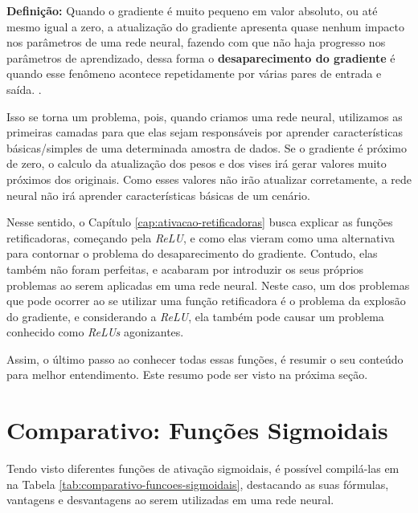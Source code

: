 \begin{definicaomoderna}{\textbf{Definição:}}
Quando o gradiente é muito pequeno em valor absoluto, ou até mesmo igual a zero, a atualização do gradiente apresenta quase nenhum impacto nos parâmetros de uma rede neural, fazendo com que não haja progresso nos parâmetros de aprendizado, dessa forma o \textbf{desaparecimento do gradiente} é quando esse fenômeno acontece repetidamente por várias pares de entrada e saída. \parencite{ActivationFunctionsLederer}.
\end{definicaomoderna}

Isso se torna um problema, pois, quando criamos uma rede neural, utilizamos as primeiras camadas para que elas sejam responsáveis por aprender características básicas/simples de uma determinada amostra de dados. Se o gradiente é próximo de zero, o calculo da atualização dos pesos e dos vises irá gerar valores muito próximos dos originais. Como esses valores não irão atualizar corretamente, a rede neural não irá aprender características básicas de um cenário.

Nesse sentido, o Capítulo \ref{cap:ativacao-retificadoras} busca explicar as funções retificadoras, começando pela \textit{ReLU}, e como elas vieram como uma alternativa para contornar o problema do desaparecimento do gradiente. Contudo, elas também não foram perfeitas, e acabaram por introduzir os seus próprios problemas ao serem aplicadas em uma rede neural. Neste caso, um dos problemas que pode ocorrer ao se utilizar uma função retificadora é o problema da explosão do gradiente, e considerando a \textit{ReLU}, ela também pode causar um problema conhecido como \textit{ReLUs} agonizantes.

Assim, o último passo ao conhecer todas essas funções, é resumir o seu conteúdo para melhor entendimento. Este resumo pode ser visto na próxima seção.

\section{Comparativo: Funções Sigmoidais}

Tendo visto diferentes funções de ativação sigmoidais, é possível compilá-las em na Tabela \ref{tab:comparativo-funcoes-sigmoidais}, destacando as suas fórmulas, vantagens e desvantagens ao serem utilizadas em uma rede neural.

